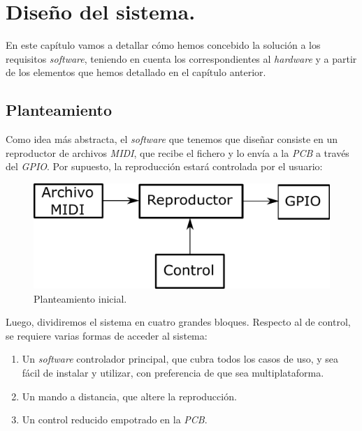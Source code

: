 \chapter{Diseño del sistema.}
\label{cap: capitulo_4}

En este capítulo vamos a detallar cómo hemos concebido la solución a los requisitos \textit{software}, teniendo en cuenta los correspondientes al \textit{hardware} y a partir de los elementos que hemos detallado en el capítulo anterior.

\section{Planteamiento}

Como idea más abstracta, el \textit{software} que tenemos que diseñar consiste en un reproductor de archivos \textit{MIDI}, que recibe el fichero y lo envía a la \textit{PCB} a través del \textit{GPIO}. Por supuesto, la reproducción estará controlada por el usuario:

\smallskip

\begin{figure}[H]
	\noindent \begin{centering}
		\includegraphics[width=\linewidth/2]{capitulo4/idea}
		\par\end{centering}
	\smallskip
	\caption{\label{fig:idea} Planteamiento inicial.}
\end{figure} 

\smallskip

Luego, dividiremos el sistema en cuatro grandes bloques. Respecto al de control, se requiere varias formas de acceder al sistema:

\begin{enumerate}
	\item Un \textit{software} controlador principal, que cubra todos los casos de uso, y sea fácil de instalar y utilizar, con preferencia de que sea multiplataforma.
	
	\item Un mando a distancia, que altere la reproducción.
	
	\item Un control reducido empotrado en la \textit{PCB}.
\end{enumerate}

